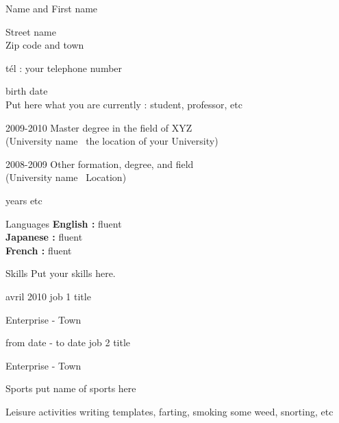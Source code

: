\documentclass[10pt,a4paper]{scrartcl}
\begin{document}
\pagestyle{empty}
\begin{cv}{}

  \begin{cvlist}{}
\item Name and First name
\item Street name\\ %
    Zip code and town
  \item \no t\'el : your telephone number
  \item birth date \\
    Put here what you are currently : student, professor, etc
  \end{cvlist}
  \begin{cvlist}{}

  \item[2009-2010] Master degree in the field of XYZ\\
    (University name \textemdash\ the location of your University)

  \item[2008-2009] Other formation, degree, and field\\
    (University name \textemdash\ Location)

  \item[years] etc

  \item[Languages] \textbf{English :} fluent\\
    \textbf{Japanese :} fluent\\
    \textbf{French :} fluent\\

  \item[Skills] Put your skills here.

  \end{cvlist}
  \begin{cvlist}{}

  \item[avril 2010] job 1 title

    Enterprise - Town

  \item[from date - to date] job 2 title

    Enterprise - Town

  \end{cvlist}
  \begin{cvlist}{}

  \item[Sports] put name of sports here

  \item[Leisure activities] writing templates, farting, smoking some
    weed, snorting, etc

  \end{cvlist}

\end{cv}
\end{document}
